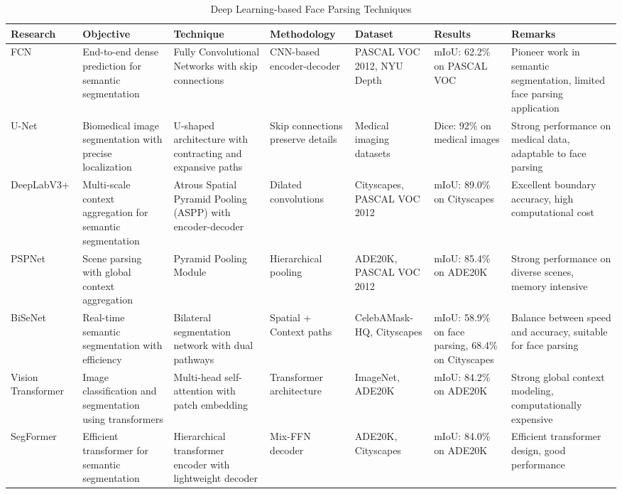 \documentclass[12pt,a4paper]{report}
\begin{document}
\newpage
\begin{landscape}
\begin{table}[H]
\centering
\caption{Deep Learning-based Face Parsing Techniques}
\label{tab:deep_learning_techniques}
\small
\begin{tabular}{|p{3cm}|p{3.5cm}|p{3cm}|p{2.5cm}|p{2.5cm}|p{3cm}|p{3.5cm}|}
\hline
\textbf{Research} & \textbf{Objective} & \textbf{Technique} & \textbf{Methodology} & \textbf{Dataset} & \textbf{Results} & \textbf{Remarks} \\
\hline
FCN \cite{long2015fully} & End-to-end dense prediction for semantic segmentation & Fully Convolutional Networks with skip connections & CNN-based encoder-decoder & PASCAL VOC 2012, NYU Depth & mIoU: 62.2\% on PASCAL VOC & Pioneer work in semantic segmentation, limited face parsing application \\
\hline
U-Net \cite{ronneberger2015unet} & Biomedical image segmentation with precise localization & U-shaped architecture with contracting and expansive paths & Skip connections preserve details & Medical imaging datasets & Dice: 92\% on medical images & Strong performance on medical data, adaptable to face parsing \\
\hline
DeepLabV3+ \cite{chen2018encoder} & Multi-scale context aggregation for semantic segmentation & Atrous Spatial Pyramid Pooling (ASPP) with encoder-decoder & Dilated convolutions & Cityscapes, PASCAL VOC 2012 & mIoU: 89.0\% on Cityscapes & Excellent boundary accuracy, high computational cost \\
\hline
PSPNet \cite{zhao2017pyramid} & Scene parsing with global context aggregation & Pyramid Pooling Module & Hierarchical pooling & ADE20K, PASCAL VOC 2012 & mIoU: 85.4\% on ADE20K & Strong performance on diverse scenes, memory intensive \\
\hline
BiSeNet \cite{yu2018bisenet} & Real-time semantic segmentation with efficiency & Bilateral segmentation network with dual pathways & Spatial + Context paths & CelebAMask-HQ, Cityscapes & mIoU: 58.9\% on face parsing, 68.4\% on Cityscapes & Balance between speed and accuracy, suitable for face parsing \\
\hline
Vision Transformer \cite{dosovitskiy2020image} & Image classification and segmentation using transformers & Multi-head self-attention with patch embedding & Transformer architecture & ImageNet, ADE20K & mIoU: 84.2\% on ADE20K & Strong global context modeling, computationally expensive \\
\hline
SegFormer \cite{xie2021segformer} & Efficient transformer for semantic segmentation & Hierarchical transformer encoder with lightweight decoder & Mix-FFN decoder & ADE20K, Cityscapes & mIoU: 84.0\% on ADE20K & Efficient transformer design, good performance \\
\hline
\end{tabular}
\end{table}
\end{landscape}
\end{document}
